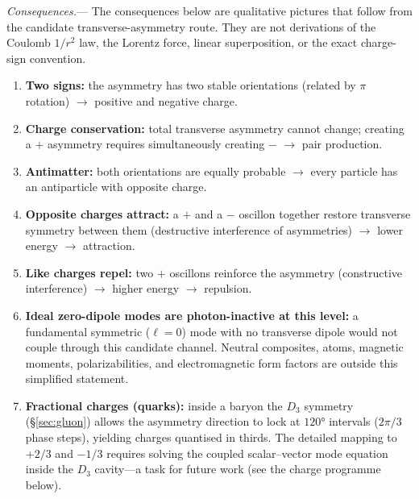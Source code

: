 \documentclass[11pt]{article}
\begin{document}
\textit{Consequences.}---
The consequences below are qualitative pictures that follow
from the candidate transverse-asymmetry route.  They are not
derivations of the Coulomb $1/r^2$ law, the Lorentz force,
linear superposition, or the exact charge-sign convention.
\begin{enumerate}
  \item \textbf{Two signs:}\;
    the asymmetry has two stable orientations
    (related by $\pi$ rotation) $\to$
    positive and negative charge.

  \item \textbf{Charge conservation:}\;
    total transverse asymmetry cannot change;
    creating a $+$ asymmetry requires
    simultaneously creating $-$ $\to$
    pair production.

  \item \textbf{Antimatter:}\;
    both orientations are equally probable
    $\to$ every particle has an antiparticle
    with opposite charge.

  \item \textbf{Opposite charges attract:}\;
    a $+$ and a $-$ oscillon together restore
    transverse symmetry between them
    (destructive interference of asymmetries)
    $\to$ lower energy $\to$ attraction.

  \item \textbf{Like charges repel:}\;
    two $+$ oscillons reinforce the asymmetry
    (constructive interference)
    $\to$ higher energy $\to$ repulsion.

  \item \textbf{Ideal zero-dipole modes are
    photon-inactive at this level:}\;
    a fundamental symmetric ($\ell = 0$) mode with
    no transverse dipole would not couple through
    this candidate channel.  Neutral composites,
    atoms, magnetic moments, polarizabilities, and
    electromagnetic form factors are outside this
    simplified statement.

  \item \textbf{Fractional charges (quarks):}\;
    inside a baryon the $D_3$ symmetry
    (\S\ref{sec:gluon}) allows the asymmetry
    direction to lock at $120°$ intervals
    ($2\pi/3$ phase steps), yielding charges
    quantised in thirds.
    The detailed mapping to $+2/3$ and $-1/3$
    requires solving the coupled
    scalar--vector mode equation inside the
    $D_3$ cavity---a task for future work
    (see the charge programme below).
\end{enumerate}
\end{document}
